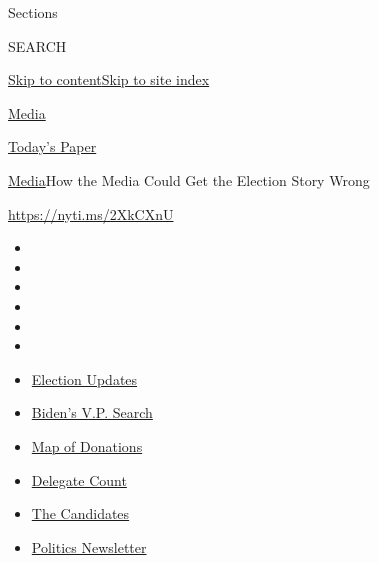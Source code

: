 Sections

SEARCH

\protect\hyperlink{site-content}{Skip to
content}\protect\hyperlink{site-index}{Skip to site index}

\href{https://www.nytimes3xbfgragh.onion/section/business/media}{Media}

\href{https://myaccount.nytimes3xbfgragh.onion/auth/login?response_type=cookie\&client_id=vi}{}

\href{https://www.nytimes3xbfgragh.onion/section/todayspaper}{Today's
Paper}

\href{/section/business/media}{Media}\textbar{}How the Media Could Get
the Election Story Wrong

\url{https://nyti.ms/2XkCXnU}

\begin{itemize}
\item
\item
\item
\item
\item
\item
\end{itemize}

\begin{itemize}
\item
  \href{https://www.nytimes3xbfgragh.onion/2020/08/03/us/elections/biden-vs-trump.html?action=click\&pgtype=Article\&state=default\&region=TOP_BANNER\&context=storylines_menu}{Election
  Updates}
\item
  \href{https://www.nytimes3xbfgragh.onion/article/biden-vice-president-2020.html?action=click\&pgtype=Article\&state=default\&region=TOP_BANNER\&context=storylines_menu}{Biden's
  V.P. Search}
\item
  \href{https://www.nytimes3xbfgragh.onion/interactive/2020/07/24/us/politics/trump-biden-campaign-donors.html?action=click\&pgtype=Article\&state=default\&region=TOP_BANNER\&context=storylines_menu}{Map
  of Donations}
\item
  \href{https://www.nytimes3xbfgragh.onion/interactive/2020/us/elections/delegate-count-primary-results.html?action=click\&pgtype=Article\&state=default\&region=TOP_BANNER\&context=storylines_menu}{Delegate
  Count}
\item
  \href{https://www.nytimes3xbfgragh.onion/interactive/2019/us/politics/2020-presidential-candidates.html?action=click\&pgtype=Article\&state=default\&region=TOP_BANNER\&context=storylines_menu}{The
  Candidates}
\item
  \href{https://www.nytimes3xbfgragh.onion/newsletters/politics?action=click\&pgtype=Article\&state=default\&region=TOP_BANNER\&context=storylines_menu}{Politics
  Newsletter}
\end{itemize}

